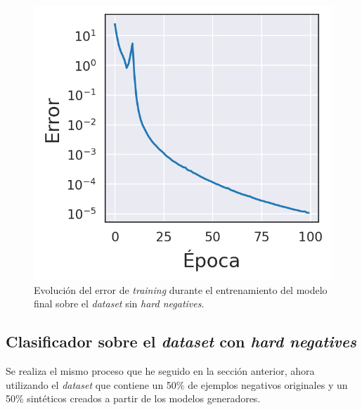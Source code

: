 \begin{figure}[H]
\centering
    \includegraphics[scale=0.67]{imagenes/image_classification/original_dataset/loss_final_model.png}
    \caption{Evolución del error de \textit{training} durante el entrenamiento del modelo final sobre el \textit{dataset} sin \textit{hard negatives}.}
\end{figure}


\newpage
\subsection{Clasificador sobre el \textit{dataset} con \textit{hard negatives}}
Se realiza el mismo proceso que he seguido en la sección anterior, ahora utilizando el \textit{dataset} que contiene un 50\% de ejemplos negativos originales y un 50\% sintéticos creados a partir de los modelos generadores.

